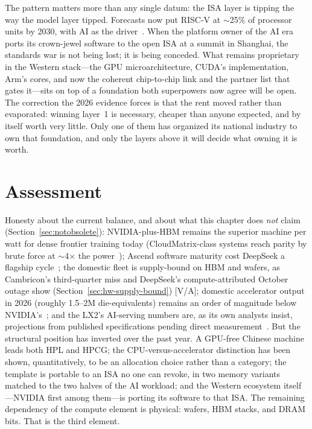 The pattern matters more than any single datum: the ISA layer is tipping the way the model layer tipped. Forecasts now put RISC-V at $\sim$25\% of processor units by 2030, with AI as the driver~\cite{shd-2026,omdia}. When the platform owner of the AI era ports its crown-jewel software to the open ISA at a summit in Shanghai, the standards war is not being lost; it is being conceded. What remains proprietary in the Western stack---the GPU microarchitecture, CUDA's implementation, Arm's cores, and now the coherent chip-to-chip link and the partner list that gates it---sits on top of a foundation both superpowers now agree will be open. The correction the 2026 evidence forces is that the rent moved rather than evaporated: winning layer~1 is necessary, cheaper than anyone expected, and by itself worth very little. Only one of them has organized its national industry to own that foundation, and only the layers above it will decide what owning it is worth.

\section{Assessment}

Honesty about the current balance, and about what this chapter does \emph{not} claim (Section~\ref{sec:notobsolete}): NVIDIA-plus-HBM remains the superior machine per watt for dense frontier training today (CloudMatrix-class systems reach parity by brute force at $\sim$4$\times$ the power~\cite{cloudmatrix}); Ascend software maturity cost DeepSeek a flagship cycle~\cite{ascend-delay}; the domestic fleet is supply-bound on HBM and wafers, as Cambricon's third-quarter miss and DeepSeek's compute-attributed October outage show (Section~\ref{sec:hw-supply-bound}) [V/A]; domestic accelerator output in 2026 (roughly 1.5--2M die-equivalents) remains an order of magnitude below NVIDIA's~\cite{semianalysis-ascend,ifp-b30a}; and the LX2's AI-serving numbers are, as its own analysts insist, projections from published specifications pending direct measurement~\cite{dhm-long}. But the structural position has inverted over the past year. A GPU-free Chinese machine leads both HPL and HPCG; the CPU-versus-accelerator distinction has been shown, quantitatively, to be an allocation choice rather than a category; the template is portable to an ISA no one can revoke, in two memory variants matched to the two halves of the AI workload; and the Western ecosystem itself---NVIDIA first among them---is porting its software to that ISA. The remaining dependency of the compute element is physical: wafers, HBM stacks, and DRAM bits. That is the third element.

